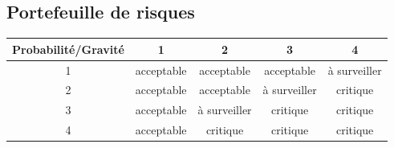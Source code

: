 \documentclass[a4paper,11pt,french]{article}
\begin{document}
\subsection*{Portefeuille de risques}
\begin{table}[!h]
\begin{tabular}{|c|c|c|c|c|}
\hline
Probabilité/Gravité & 1 & 2 & 3 & 4 \\
\hline
1 & \cellcolor{green} acceptable & \cellcolor{green} acceptable & \cellcolor{green} acceptable & \cellcolor{yellow} à surveiller \\
\hline
2 & \cellcolor{green} acceptable & \cellcolor{green} acceptable & \cellcolor{yellow} à surveiller & \cellcolor{red} critique \\
\hline
3 & \cellcolor{green} acceptable & \cellcolor{yellow} à surveiller & \cellcolor{red} critique & \cellcolor{red} critique \\
\hline
4 & \cellcolor{green} acceptable & \cellcolor{red} critique & \cellcolor{red} critique & \cellcolor{red} critique\\
\hline
\end{tabular}
\end{table}
\end{document}
